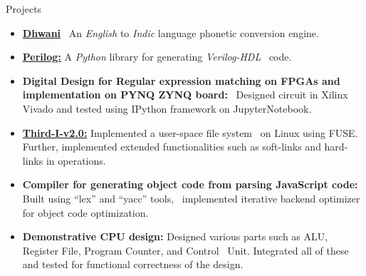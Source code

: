\documentclass{CV} %
\begin{document}
\begin{rSection}{Projects}

  \begin{itemize}

  \item \textbf{\href{https://ndyashas.github.io/projects/Dhwani.html}{Dhwani}} \
    An \textit{English} to \textit{Indic} language phonetic conversion engine. 

  \item \textbf{\href{https://github.com/verinyce/perilog}{Perilog:}} A \textit{Python} library for generating \textit{Verilog-HDL} \
    code.
    
  \item \textbf{Digital Design for Regular expression matching on FPGAs and implementation on PYNQ ZYNQ board:} \
    Designed circuit in Xilinx Vivado and tested using IPython framework on JupyterNotebook.

  \item \textbf{\href{https://github.com/ndyashas/Third-I-v2.0}{Third-I-v2.0:}} Implemented a user-space file system \
    on Linux using FUSE. Further, implemented extended functionalities such as soft-links and hard-links in operations.

  \item \textbf{Compiler for generating object code from parsing JavaScript code:} Built using ``lex'' and ``yacc'' tools, \
    implemented iterative backend optimizer for object code optimization.

  \item \textbf{Demonstrative CPU design:} Designed various parts such as ALU, Register File, Program Counter, and Control \
    Unit. Integrated all of these and tested for functional correctness of the design.
    
  \end{itemize}
  
\end{rSection}


\end{document}
